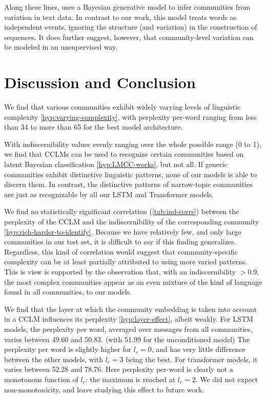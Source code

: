 \documentclass[11pt]{article}
\begin{document}
Along these lines, \citet{OConnor2010} uses a Bayesian generative
model to infer communities from variation in text data.  In contrast
to our work, this model treats words as independent events, ignoring
the structure (and variation) in the construction of sequences.  It
does further suggest, however, that community-level variation can be
modeled in an unsupervised way.

\section{Discussion and Conclusion}

We find that various communities exhibit widely varying levels of
linguistic complexity \ref{hyp:varying-complexity}, with perplexity
per-word ranging from less than 34 to more than 65 for the best model 
architecture.

With indiscernibility values evenly ranging over the whole possible
range (0 to 1), we find that CCLMs can be used to recognize certain
communities based on latent Bayesian classification
\ref{hyp:LMCC-works}, but not all.  If generic communities exhibit
distinctive linguistic patterns, none of our models is able to discern
them. In contrast, the distinctive patterns of narrow-topic
communities are just as recognizable by all our LSTM and Transformer
models.

We find no statistically significant correlation (\cref{tab:ind-corrs}) between the
perplexity of the
CCLM and the indiscernibility of the corresponding community
\ref{hyp:rich-harder-to-identify}. Because we have relatively few, and
only large communities in our test set, it is difficult to say if this
finding generalizes. Regardless, this kind of correlation would suggest that
community-specific complexity can be at least partially attributed to
using more varied patterns. This is view is supported by the
observation that, with an indiscernibility $> 0.9$, the most complex
communities appear as an even mixture of the kind of language found in
all communities, to our models.

We find that the layer at which the community embedding is taken into
account in a CCLM influences its perplexity \ref{hyp:layer-effect},
albeit weakly. For LSTM models, the perplexity per word, averaged over
messages from all communities, varies between \num{49.60} and \num{50.83}. (with \num{51.99} for the
unconditioned model) The perplexity per word is slightly higher for
$l_c=0$, and has very little difference between the other models, with
$l_c=3$ being the best.  For transformer models, it varies between 
\num{52.28} and \num{78.76}. Here perplexity per-word is clearly not a monotonous
function of $l_c$: the maximum is reached at $l_c=2$. We did not
expect non-monotonicity, and leave studying this effect to future
work.
\end{document}

